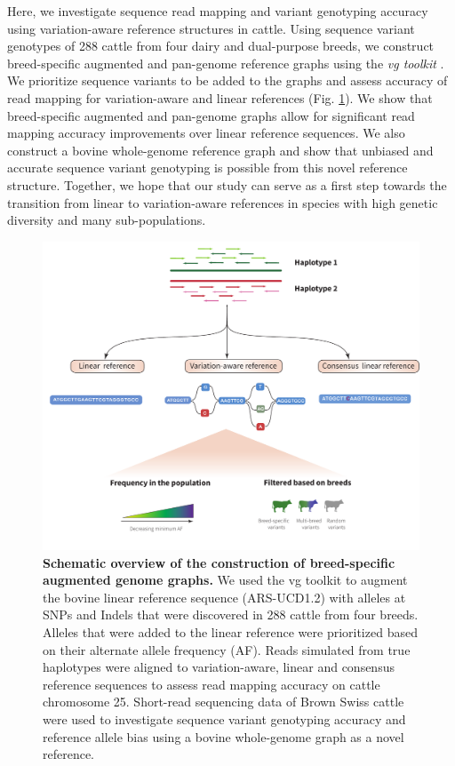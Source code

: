 \documentclass[../main.tex]{subfiles}
\begin{document}
Here, we investigate sequence read mapping and variant genotyping accuracy using variation-aware reference structures in cattle. Using sequence variant genotypes of 288 cattle from four dairy and dual-purpose breeds, we construct breed-specific augmented and pan-genome reference graphs using the \emph{vg toolkit} \citep{garrison2018variation}. We prioritize sequence variants to be added to the graphs and assess accuracy of read mapping for variation-aware and linear references (Fig. \ref{fig31:pipe}). We show that breed-specific augmented and pan-genome graphs allow for significant read mapping accuracy improvements over linear reference sequences. We also construct a bovine whole-genome reference graph and show that unbiased and accurate sequence variant genotyping is possible from this novel reference structure. Together, we hope that our study can serve as a first step towards the transition from linear to variation-aware references in species with high genetic diversity and many sub-populations.

\begin{figure}[!htb]
    \centering
    \includegraphics[width=\textwidth]{paper2/main_figure/Fig1.pdf}
    \caption[Study scheme]{\textbf{Schematic overview of the construction of breed-specific augmented genome graphs.} 
    \small{We used the vg toolkit to augment the bovine linear reference sequence (ARS-UCD1.2) with alleles at SNPs and Indels that were discovered in 288 cattle from four breeds. Alleles that were added to the linear reference were prioritized based on their alternate allele frequency (AF). Reads simulated from true haplotypes were aligned to variation-aware, linear and consensus reference sequences to assess read mapping accuracy on cattle chromosome 25. Short-read sequencing data of Brown Swiss cattle were used to investigate sequence variant genotyping accuracy and reference allele bias using a bovine whole-genome graph as a novel reference.}}
    \label{fig31:pipe}
\end{figure}
\end{document}
